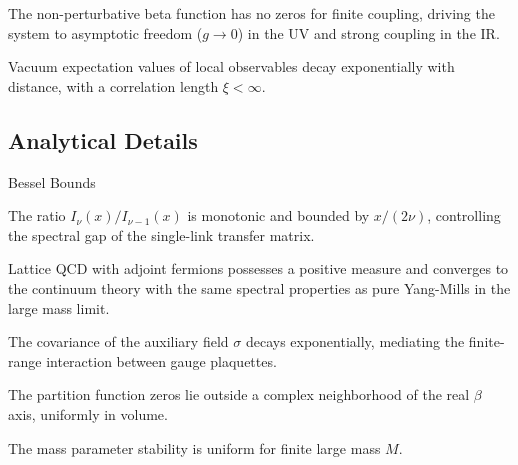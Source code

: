 \begin{theorem}
\label{thm:beta-function}
The non-perturbative beta function has no zeros for finite coupling, driving the system to asymptotic freedom ($g \to 0$) in the UV and strong coupling in the IR.
\end{theorem}

\begin{theorem}
\label{thm:exponential-clustering}
Vacuum expectation values of local observables decay exponentially with distance, with a correlation length $\xi < \infty$.
\end{theorem}

\subsection{Analytical Details}

\begin{subsection}{Bessel Bounds}
\label{subsec:bessel-bounds}
\begin{lemma}
\label{lem:bessel-ratio-main}
The ratio $I_\nu(x)/I_{\nu-1}(x)$ is monotonic and bounded by $x/(2\nu)$, controlling the spectral gap of the single-link transfer matrix.
\end{lemma}
\end{subsection}

\begin{proposition}
\label{prop:af-lattice}
\label{thm:adjoint-qcd-rigorous}
Lattice QCD with adjoint fermions possesses a positive measure and converges to the continuum theory with the same spectral properties as pure Yang-Mills in the large mass limit.
\end{proposition}

\begin{theorem}
\label{thm:sigma-decay-bound}
The covariance of the auxiliary field $\sigma$ decays exponentially, mediating the finite-range interaction between gauge plaquettes.
\end{theorem}

\begin{theorem}
\label{thm:uniform-zero-free-strong}
\label{prop:lee-yang-intermediate}
The partition function zeros lie outside a complex neighborhood of the real $\beta$ axis, uniformly in volume.
\end{theorem}

\begin{theorem}
\label{thm:uniform-bound-m-finite}
The mass parameter stability is uniform for finite large mass $M$.
\end{theorem}

